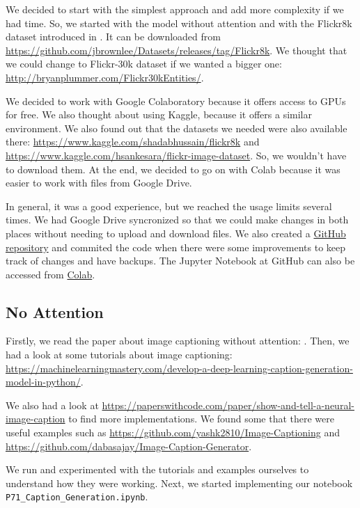\documentclass{article} %
\begin{document}
We decided to start with the simplest approach and add more complexity if we had time. So, we started with the model without attention and with the Flickr8k dataset introduced in \cite{Flickr8k}. It can be downloaded from \url{https://github.com/jbrownlee/Datasets/releases/tag/Flickr8k}. We thought that we could change to Flickr-30k dataset if we wanted a bigger one: \url{http://bryanplummer.com/Flickr30kEntities/}.

We decided to work with Google Colaboratory because it offers access to GPUs for free. We also thought about using Kaggle, because it offers a similar environment. We also found out that the datasets we needed were also available there: \url{https://www.kaggle.com/shadabhussain/flickr8k} and \url{https://www.kaggle.com/hsankesara/flickr-image-dataset}. So, we wouldn't have to download them. At the end, we decided to go on with Colab because it was easier to work with files from Google Drive.

In general, it was a good experience, but we reached the usage limits several times. We had Google Drive syncronized so that we could make changes in both places without needing to upload and download files. We also created a \href{https://github.com/juletx/neural-caption-generation}{GitHub repository} and commited the code when there were some improvements to keep track of changes and have backups. The Jupyter Notebook at GitHub can also be accessed from \href{https://colab.research.google.com/github/juletx/neural-caption-generation/blob/main/notebook/P71_OIER_Caption_Generation.ipynb}{Colab}.

\subsection{No Attention}
Firstly, we read the paper about image captioning without attention: \cite{ShowTell}. Then, we had a look at some tutorials about image captioning: \url{https://machinelearningmastery.com/develop-a-deep-learning-caption-generation-model-in-python/}. 

We also had a look at \url{https://paperswithcode.com/paper/show-and-tell-a-neural-image-caption} to find more implementations. We found some that there were useful examples such as \url{https://github.com/yashk2810/Image-Captioning} and \url{https://github.com/dabasajay/Image-Caption-Generator}.

We run and experimented with the tutorials and examples ourselves to understand how they were working. Next, we started implementing our notebook \texttt{P71\_Caption\_Generation.ipynb}.
\end{document}
